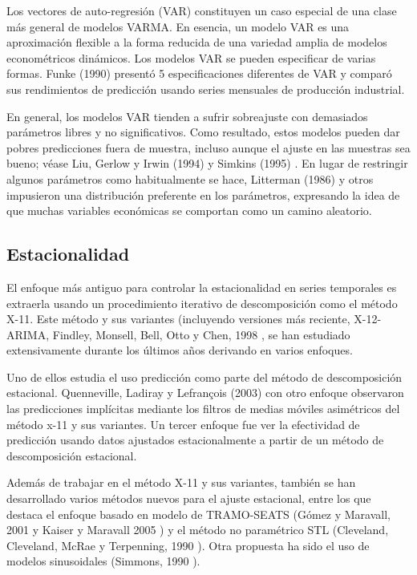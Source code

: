 \documentclass{llncs}
\begin{document}
Los vectores de auto-regresión (VAR) constituyen un caso especial de una clase más general de modelos VARMA. En esencia, un modelo VAR es una aproximación flexible a la forma reducida de una variedad amplia de modelos econométricos dinámicos. Los modelos VAR se pueden especificar de varias formas. Funke (1990) \cite{Funke1990363} presentó 5 especificaciones diferentes de VAR y comparó sus rendimientos de predicción usando series mensuales de producción industrial.

En general, los modelos VAR tienden a sufrir sobreajuste con demasiados parámetros libres y no significativos. Como resultado, estos modelos pueden dar pobres predicciones fuera de muestra, incluso aunque el ajuste en las muestras sea bueno; véase Liu, Gerlow y Irwin (1994) \cite{Liu1994419} y Simkins (1995) \cite{Simkins1995569}. En lugar de restringir algunos parámetros como habitualmente se hace, Litterman (1986) \cite{Litterman198625} y otros impusieron una distribución preferente en los parámetros, expresando la idea de que muchas variables económicas se comportan como un camino aleatorio. 

\subsection{Estacionalidad}

El enfoque más antiguo para controlar la estacionalidad en series temporales es extraerla usando un procedimiento iterativo de descomposición como el método X-11. Este método y sus variantes (incluyendo versiones más reciente, X-12-ARIMA, Findley, Monsell, Bell, Otto y Chen, 1998 \cite{Findley1998127}, se han estudiado extensivamente durante los últimos años derivando en varios enfoques.

Uno de ellos estudia el uso predicción como parte del método de descomposición estacional. Quenneville, Ladiray y Lefrançois (2003) \cite{Quenneville2003727} con otro enfoque observaron las predicciones implícitas mediante los filtros de medias móviles asimétricos del método x-11 y sus variantes. Un tercer enfoque fue ver la efectividad de predicción usando datos ajustados estacionalmente a partir de un método de descomposición estacional. 

Además de trabajar en el método X-11 y sus variantes, también se han desarrollado varios métodos nuevos para el ajuste estacional, entre los que destaca el enfoque basado en modelo de TRAMO-SEATS (Gómez y Maravall, 2001 \cite{Gomez2001} y Kaiser y Maravall 2005 \cite{Kaiser2005691}) y el método no paramétrico STL (Cleveland, Cleveland, McRae y Terpenning, 1990 \cite{Cleveland19903}). Otra propuesta ha sido el uso de modelos sinusoidales (Simmons, 1990 \cite{Simmons1990485}).
\end{document}
